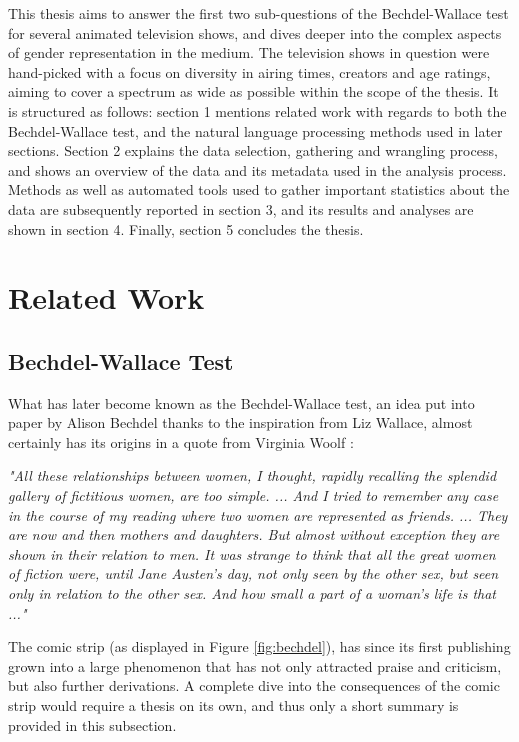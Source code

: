\documentclass[a4paper, 11pt]{article}
\begin{document}
This thesis aims to answer the first two sub-questions of the Bechdel-Wallace test for several animated television shows, and dives deeper into the complex aspects of gender representation in the medium. The television shows in question were hand-picked with a focus on diversity in airing times, creators and age ratings, aiming to cover a spectrum as wide as possible within the scope of the thesis. It is structured as follows: section 1 mentions related work with regards to both the Bechdel-Wallace test, and the natural language processing methods used in later sections. Section 2 explains the data selection, gathering and wrangling process, and shows an overview of the data and its metadata used in the analysis process. Methods as well as automated tools used to gather important statistics about the data are subsequently reported in section 3, and its results and analyses are shown in section 4. Finally, section 5 concludes the thesis.

\section{Related Work}

\subsection{Bechdel-Wallace Test}
What has later become known as the Bechdel-Wallace test, an idea put into paper by Alison Bechdel thanks to the inspiration from Liz Wallace, almost certainly has its origins in a quote from Virginia Woolf \citep{testy}:

\begin{center}
\textit{"All these relationships between women, I thought, rapidly recalling the splendid gallery of fictitious women, are too simple. ... And I tried to remember any case in the course of my reading where two women are represented as friends. ... They are now and then mothers and daughters. But almost without exception they are shown in their relation to men. It was strange to think that all the great women of fiction were, until Jane Austen's day, not only seen by the other sex, but seen only in relation to the other sex. And how small a part of a woman's life is that ..."} \citep{woolf}
\end{center}

The comic strip (as displayed in Figure \ref{fig:bechdel}), has since its first publishing grown into a large phenomenon that has not only attracted praise and criticism, but also further derivations. A complete dive into the consequences of the comic strip would require a thesis on its own, and thus only a short summary is provided in this subsection.
\end{document}
